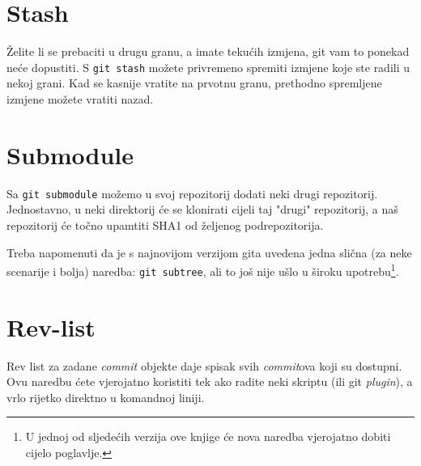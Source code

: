 \section*{Stash}

Želite li se prebaciti u drugu granu, a imate tekućih izmjena, git vam to ponekad neće dopustiti.
S \verb+git stash+ možete privremeno spremiti izmjene koje ste radili u nekoj grani.
Kad se kasnije vratite na prvotnu granu, prethodno spremljene izmjene možete vratiti nazad.

\section*{Submodule}

Sa \verb+git submodule+ možemo u svoj repozitorij dodati neki drugi repozitorij. 
Jednostavno, u neki direktorij će se klonirati cijeli taj "drugi" repozitorij, a naš repozitorij će točno upamtiti SHA1 od željenog podrepozitorija.

Treba napomenuti da je s najnovijom verzijom gita uvedena jedna slična (za neke scenarije i bolja) naredba: \verb+git subtree+, ali to još nije ušlo u široku upotrebu\footnote{U jednoj od sljedećih verzija ove knjige će nova naredba vjerojatno dobiti cijelo poglavlje.}.

\section*{Rev-list}

Rev list za zadane \emph{commit} objekte daje spisak svih \emph{commit}ova koji su dostupni.
Ovu naredbu ćete vjerojatno koristiti tek ako radite neki skriptu (ili git \emph{plugin}), a vrlo rijetko direktno u komandnoj liniji.

